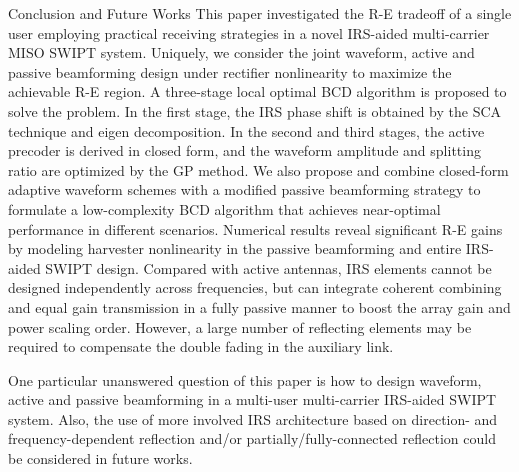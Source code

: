 \documentclass[journal]{IEEEtran}
\begin{document}
	\begin{section}{Conclusion and Future Works}\label{se:conclusion_and_future_works}
		This paper investigated the R-E tradeoff of a single user employing practical receiving strategies in a novel IRS-aided multi-carrier MISO SWIPT system. Uniquely, we consider the joint waveform, active and passive beamforming design under rectifier nonlinearity to maximize the achievable R-E region. A three-stage local optimal BCD algorithm is proposed to solve the problem. In the first stage, the IRS phase shift is obtained by the SCA technique and eigen decomposition. In the second and third stages, the active precoder is derived in closed form, and the waveform amplitude and splitting ratio are optimized by the GP method. We also propose and combine closed-form adaptive waveform schemes with a modified passive beamforming strategy to formulate a low-complexity BCD algorithm that achieves near-optimal performance in different scenarios. Numerical results reveal significant R-E gains by modeling harvester nonlinearity in the passive beamforming and entire IRS-aided SWIPT design. Compared with active antennas, IRS elements cannot be designed independently across frequencies, but can integrate coherent combining and equal gain transmission in a fully passive manner to boost the array gain and power scaling order. However, a large number of reflecting elements may be required to compensate the double fading in the auxiliary link.

        One particular unanswered question of this paper is how to design waveform, active and passive beamforming in a multi-user multi-carrier IRS-aided SWIPT system. Also, the use of more involved IRS architecture based on direction- and frequency-dependent reflection \cite{Abeywickrama2020} and/or partially/fully-connected reflection \cite{Shen2020a} could be considered in future works.
	\end{section}
\end{document}
